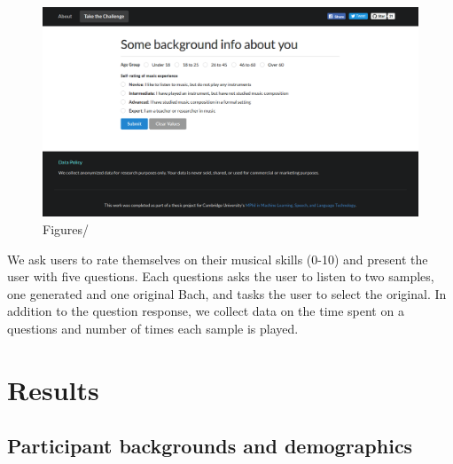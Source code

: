 \documentclass[dissertation.tex]{subfiles}
\begin{document}
\begin{figure}[htpb]
  \centering
  \includegraphics[width=1.0\linewidth]{Figures/user-info-form.png}
  \caption{Figures/}
  \label{fig:user-info-form}
\end{figure}

We ask users to rate themselves on their musical skills (0-10) and present the
user with five questions. Each questions asks the user to listen to two
samples, one generated and one original Bach, and tasks the user to select the
original. In addition to the question response, we collect data on the time
spent on a questions and number of times each sample is played.

\section{Results}

\subsection{Participant backgrounds and demographics}
\end{document}

